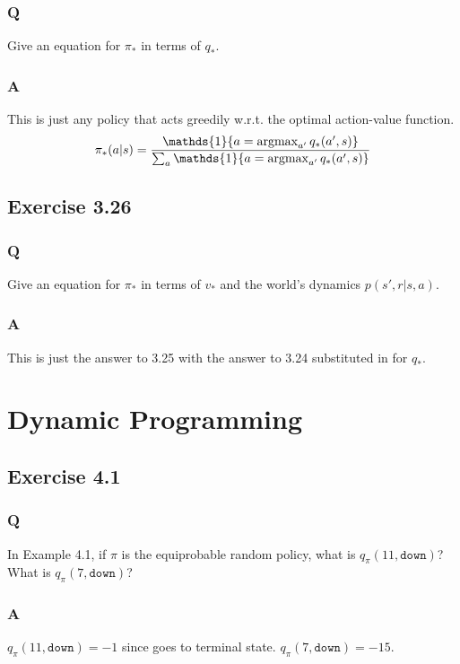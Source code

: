 \subsubsection{Q}
Give an equation for $\pi_*$ in terms of $q_*$.

\subsubsection{A}
This is just any policy that acts greedily w.r.t. the optimal action-value function.
\begin{equation}
    \pi_* (a|s) = \frac{\mathds{1}\{a = \argmax_{a'} q_*(a', s)\}}{\sum_{a} \mathds{1}\{a = \argmax_{a'}q_*(a', s)\}}
\end{equation} 

\subsection{Exercise 3.26}
\subsubsection{Q}
Give an equation for $\pi_*$ in terms of $v_*$ and the world's dynamics $p(s', r| s, a)$.

\subsubsection{A}
This is just the answer to 3.25 with the answer to 3.24 substituted in for $q_*$.



\clearpage
\section{Dynamic Programming}

\subsection{Exercise 4.1}
\subsubsection{Q}
In Example 4.1, if $\pi$ is the equiprobable random policy, what is $q_\pi(11, \mathtt{down})$? What is $q_\pi(7, \mathtt{down})$?

\subsubsection{A}
$q_\pi(11, \mathtt{down}) = -1$ since goes to terminal state. $q_\pi(7, \mathtt{down}) = -15$.

